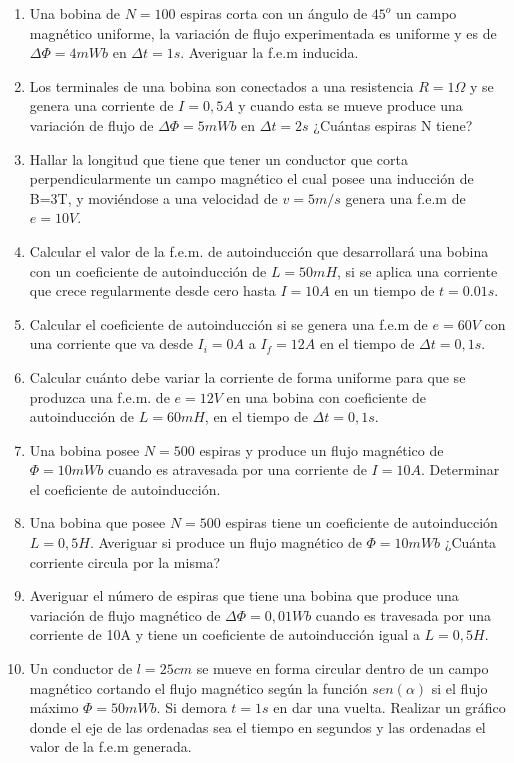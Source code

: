 \documentclass[../main]{subfiles}
\begin{document}
\begin{enumerate}
    \item Una bobina de $N=100$ espiras corta con un ángulo de $45^o$ un campo magnético uniforme, la variación de flujo experimentada es uniforme y es de $\Delta \Phi = 4mWb$ en $\Delta t = 1s$. Averiguar la f.e.m inducida.
    \item Los terminales de una bobina son conectados a una resistencia $R=1\Omega$ y se genera una corriente de $I=0,5A$ y cuando esta se mueve produce una variación de flujo de  $\Delta \Phi =5mWb$ en $\Delta t = 2s$ ¿Cuántas espiras N tiene?
    \item Hallar la longitud que tiene que tener un conductor que corta perpendicularmente un campo magnético el cual posee una inducción de B=3T, y moviéndose a una velocidad de $v=5m/s$ genera una f.e.m de $e=10V$.
    \item Calcular el valor de la f.e.m. de autoinducción que desarrollará una bobina con un coeficiente de autoinducción de $L=50mH$, si se aplica una corriente que crece regularmente desde cero hasta $I=10A$ en un tiempo de $t=0.01s$.
    \item Calcular el coeficiente de autoinducción si se genera una f.e.m de $e=60V$ con una corriente que va desde $I_i=0A$ a $I_f=12A$ en el tiempo de $\Delta t=0,1s$.
    \item Calcular cuánto debe variar la corriente de forma uniforme para que se produzca una f.e.m. de $e=12V$ en una bobina con coeficiente de autoinducción de $L=60mH$, en el tiempo de $\Delta t=0,1s$.
    \item Una bobina posee $N=500$ espiras y produce un flujo magnético de $\Phi=10mWb$ cuando es atravesada por una corriente de $I=10A$. Determinar el coeficiente de autoinducción.
    \item Una bobina que posee $N=500$ espiras tiene un coeficiente de autoinducción $L=0,5H$. Averiguar si produce un flujo magnético de $\Phi=10mWb$ ¿Cuánta corriente circula por la misma?
    \item Averiguar el número de espiras que tiene una bobina que produce una variación de flujo magnético de $\Delta \Phi=0,01Wb$ cuando es travesada por una corriente de 10A y tiene un coeficiente de autoinducción igual a $L=0,5H$.
    \item Un conductor de $l=25cm$ se mueve en forma circular dentro de un campo magnético cortando el flujo magnético según la función $sen(\alpha)$ si el flujo máximo $\Phi=50mWb$. Si demora $t=1s$ en dar una vuelta. Realizar un gráfico donde el eje de las ordenadas sea el tiempo en segundos y las ordenadas el valor de la f.e.m generada.

\end{enumerate}
\end{document}
